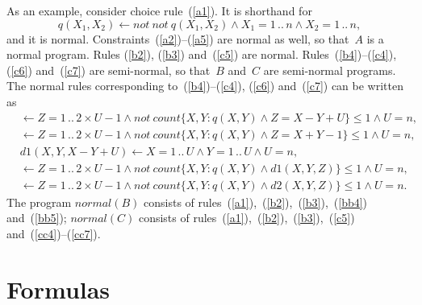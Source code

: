 \documentclass[11pt]{article}
\def\ar{\leftarrow}
\def\beq{\begin{equation}}
\def\eeq#1{\label{#1}\end{equation}}
\newcommand{\co}{\ensuremath{\mathit{count}}}
\newcommand{\no}{\ensuremath{\mathit{not}}}
\begin{document}
\begin{adjustwidth}{-1cm}{-1cm}
As an example, consider choice rule~(\ref{a1}).  It is shorthand for
\beq
q(X_1,X_2) \ar \no\ \no\ q(X_1,X_2)
\land X_1 = 1\,..\,n \land X_2= 1\,..\,n,
\eeq{aa1}
and it is normal.  Constraints~(\ref{a2})--(\ref{a5}) are normal as well,
so that~$A$ is a normal program.  Rules (\ref{b2}), (\ref{b3})
and~(\ref{c5}) are normal.  Rules~(\ref{b4})--(\ref{c4}), (\ref{c6})
and~(\ref{c7}) are semi-normal, so that~$B$ and~$C$ are semi-normal programs.
The normal rules corresponding to~(\ref{b4})--(\ref{c4}), (\ref{c6})
and~(\ref{c7}) can be written as
\begin{align}
&\ar Z = 1\,..\,2\times U-1
  \land \no\   \co\{ X,Y : q(X,Y) \land Z = X-Y+U \} \leq  1\wedge U=n,
  \label{bb4}
  \\
& \ar Z = 1\,..\,2\times U-1
  \land \no\   \co\{ X,Y : q(X,Y) \land Z = X+Y-1 \} \leq  1 \wedge U=n,
\label{bb5}\\
& d1(X,Y,X-Y+U) \ar X = 1\,..\,U\wedge  Y = 1\,..\,U\wedge U=n,\label{cc4}\\
&\ar Z = 1\,..\,2\times U-1\wedge not\ count \{ X,Y: q(X,Y) \wedge d1(X,Y,Z) \} \leq 1\wedge U=n,\label{cc6}\\
&\ar Z = 1\,..\,2\times U-1\wedge not\ count   \{X,Y:  q(X,Y) \wedge d2(X,Y,Z) \} \leq 1\wedge U=n.\label{cc7}    
\end{align}
The program $\mathit{normal}(B)$ consists of
rules~(\ref{a1}),~(\ref{b2}),~(\ref{b3}),~(\ref{bb4}) and~(\ref{bb5});
$\mathit{normal}(C)$ consists of
rules~(\ref{a1}),~(\ref{b2}),~(\ref{b3}),~(\ref{c5})
and~(\ref{cc4})--(\ref{cc7}).

\section{Formulas}


\end{adjustwidth}
\end{document}
